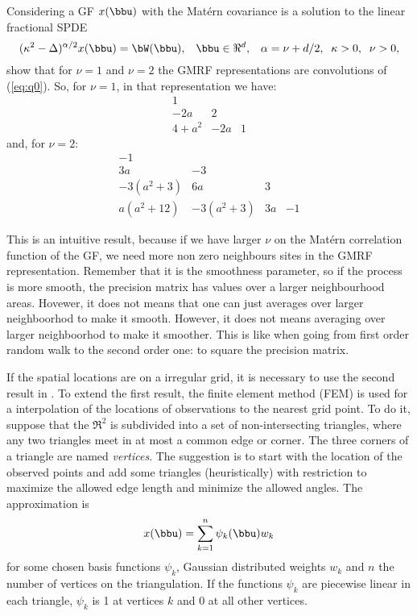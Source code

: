 Considering a GF $x(\bbu)$ with the Mat\'ern 
covariance is a solution to the linear fractional SPDE 
\begin{equation}
(\kappa^2 - \Delta )^{\alpha/2}x(\bbu) = \bW (\bbu ),\;\;\;
\bbu \in \Re^d,\;\;\;\alpha=\nu+d/2,\;\;\kappa>0,\;\;\nu>0,
\end{equation}
\cite{lindgrenRL:2011} show that for $\nu=1$ and $\nu=2$ 
the GMRF representations are convolutions of (\ref{eq:q0}). 
So, for $\nu=1$, in that representation we have:
\begin{equation}
\begin{matrix}
1  & & \\
-2a & 2 & \\
4+a^2 & -2a & 1
\end{matrix}
\end{equation}\label{eq:q1}
and, for $\nu=2$:
\begin{equation}
\begin{matrix}
-1  & & &\\
3a & -3 & &\\
-3(a^2+3) & 6a & 3 & \\
a(a^2+12) & -3(a^2+3) & 3a & -1
\end{matrix}
\end{equation}\label{eq:q2}

This is an intuitive result, because if we have 
larger $\nu$ on the Mat\'ern correlation function of the GF, 
we need more non zero neighbours sites in the GMRF representation. 
Remember that it is the smoothness parameter, so if the 
process is more smooth, the precision matrix has values over 
a larger neighbourhood areas. 
Hovewer, it does not means that one can just averages over 
larger neighboorhod to make it smooth. 
However, it does not means averaging over larger 
neighboorhod to make it smoother. 
This is like when going from first order random walk to 
the second order one: to square the precision matrix. 

If the spatial locations are on a irregular grid, 
it is necessary to use the second result in
\cite{lindgrenRL:2011}. 
To extend the first result, the finite element 
method (FEM) is used for a interpolation of 
the locations of observations to the nearest grid point. 
To do it, suppose that the $\Re^2$ is subdivided into 
a set of non-intersecting triangles, where any two
triangles meet in at most a common edge or corner. 
The three corners of a triangle are named \textit{vertices}.
The suggestion is to start with the location of the 
observed points and add some triangles (heuristically) 
with restriction to maximize the allowed edge length 
and minimize the allowed angles. 
The approximation is 
\[x(\bbu) = \sum_{k=1}^{n}\psi_k(\bbu)w_k\]
for some chosen basis functions {$\psi_k$}, 
Gaussian distributed weights $w_k$ and $n$ the 
number of vertices on the triangulation.
If the functions $\psi_k$ are piecewise linear in each 
triangle, $\psi_k$ is 1 at vertices $k$ and 0 at all 
other vertices. 

